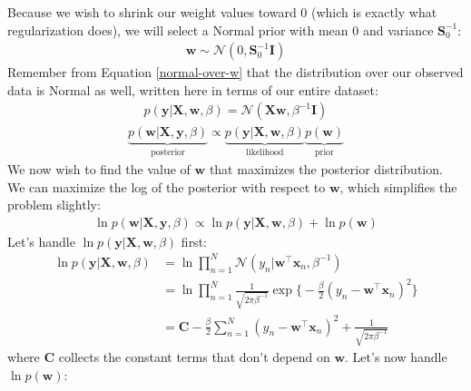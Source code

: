 \begin{derivation}
    Because we wish to shrink our weight values toward 0 (which is exactly what regularization does), we will select a Normal prior with mean 0 and variance $\boldsymbol{S}_0^{-1}$:
    \begin{align*}
        \mathbf{w} \sim \mathcal{N}(0, \boldsymbol{S}_0^{-1}\mathbf{I})
    \end{align*}
    Remember from Equation \ref{normal-over-w} that the distribution over our observed data is Normal as well, written here in terms of our entire dataset:
    \begin{align*}
        p(\mathbf{y} | \mathbf{X}, \mathbf{w}, \beta) = \mathcal{N}(\mathbf{X}\mathbf{w}, \beta^{-1}\mathbf{I})
    \end{align*}
    \begin{align*}
        \underbrace{p(\mathbf{w}|\mathbf{X},\mathbf{y}, \beta)}_{\text{posterior}} \propto \underbrace{p(\mathbf{y}| \mathbf{X}, \mathbf{w}, \beta)}_{\text{likelihood}}\underbrace{p(\mathbf{w})}_{\text{prior}}
    \end{align*}
    We now wish to find the value of $\mathbf{w}$ that maximizes the posterior distribution. We can maximize the log of the posterior with respect to $\mathbf{w}$, which simplifies the problem slightly:
    \begin{align*}
        \ln{p(\mathbf{w}|\mathbf{X},\mathbf{y}, \beta)} \propto \ln{p(\mathbf{y}| \mathbf{X}, \mathbf{w}, \beta)} + \ln{p(\mathbf{w})}
    \end{align*}
    Let's handle $\ln{p(\mathbf{y}| \mathbf{X}, \mathbf{w}, \beta)}$ first:
    \begin{align*}
        \ln{p(\mathbf{y}| \mathbf{X}, \mathbf{w}, \beta)} &= \ln{\prod_{n=1}^{N} \mathcal{N}(y_n | \mathbf{w}^\top \mathbf{x}_n, \beta^{-1})} \\
        &= \ln{\prod_{n=1}^{N} \frac{1}{\sqrt{2\pi\beta^{-1}}} \exp{\bigg\{-\frac{\beta}{2}(y_n - \mathbf{w}^\top \mathbf{x}_n)^2\bigg\}}} \\
        &= \mathbf{C} -\frac{\beta}{2}\sum_{n=1}^{N} (y_n - \mathbf{w}^\top \mathbf{x}_n)^2 + \frac{1}{\sqrt{2\pi\beta^{-1}}}
    \end{align*}
    where $\mathbf{C}$ collects the constant terms that don't depend on $\mathbf{w}$. Let's now handle $\ln{p(\mathbf{w})}$:
    \begin{align*}

\end{align*}
\end{derivation}
